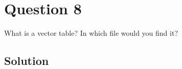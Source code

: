 \section*{Question 8}

What is a vector table?
In which file would you find it?

\subsection*{Solution}
